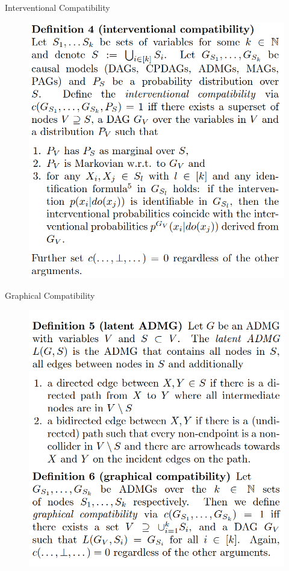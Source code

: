 \documentclass{beamer}
\begin{document}
\begin{frame}{Interventional Compatibility}
	\begin{figure}
		\centering
		\includegraphics[scale=0.25]{imgs/def4.png}
	\end{figure}
\end{frame}

\begin{frame}{Graphical Compatibility}
	\begin{figure}
		\centering
		\includegraphics[scale=0.25]{imgs/def5_6.png}
	\end{figure}
\end{frame}
\end{document}
